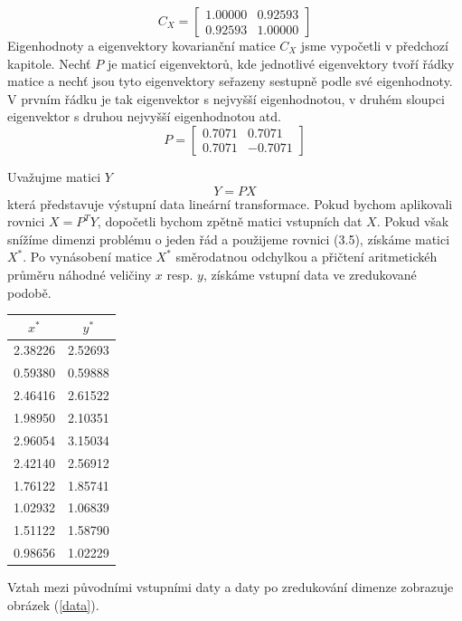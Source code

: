 \documentclass[a4paper]{book}
\begin{document}
\begin{equation*}
C_X =
     \begin{bmatrix}
          1.00000 & 0.92593 \\
          0.92593 & 1.00000
     \end{bmatrix}
\end{equation*}
Eigenhodnoty a eigenvektory kovarianční matice $C_X$ jsme vypočetli v předchozí kapitole. Nechť $P$ je maticí eigenvektorů, kde jednotlivé eigenvektory tvoří řádky matice a nechť jsou tyto eigenvektory seřazeny sestupně podle své eigenhodnoty. V prvním řádku je tak eigenvektor s nejvyšší eigenhodnotou, v druhém sloupci eigenvektor s druhou nejvyšší eigenhodnotou atd.
\begin{equation*}
P =
     \begin{bmatrix}
          0.7071 & 0.7071 \\
          0.7071 & -0.7071
     \end{bmatrix}
\end{equation*}

Uvažujme matici $Y$
\begin{equation*}
Y = PX
\end{equation*}
která představuje výstupní data lineární transformace. Pokud bychom aplikovali rovnici $X = P^TY$, dopočetli bychom zpětně matici vstupních dat $X$. Pokud však snížíme dimenzi problému o jeden řád a použijeme rovnici (3.5), získáme matici $X^*$.
Po vynásobení matice $X^*$ směrodatnou odchylkou a přičtení aritmetickéh průměru náhodné veličiny $x$ resp. $y$, získáme vstupní data ve zredukované podobě.
\begin{center}
     \begin{tabular}{c | c}
     $x^*$ & $y^*$ \\
     \hline
	2.38226 & 2.52693 \\
	0.59380 & 0.59888 \\
	2.46416 & 2.61522 \\
	1.98950 & 2.10351 \\
	2.96054 & 3.15034 \\
	2.42140 & 2.56912 \\
	1.76122 & 1.85741 \\
	1.02932 & 1.06839 \\
	1.51122 & 1.58790 \\
	0.98656 & 1.02229 \\
    \end{tabular}
\end{center}
Vztah mezi původními vstupními daty a daty po zredukování dimenze zobrazuje obrázek (\ref{data}).
\end{document}
